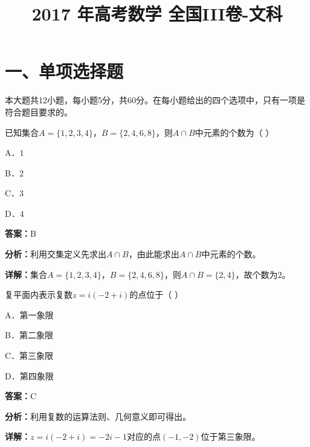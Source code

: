 ﻿\title{2017 年高考数学 全国III卷-文科}
\date{}
\maketitle

\section*{一、单项选择题}
本大题共12小题，每小题5分，共60分。在每小题给出的四个选项中，只有一项是符合题目要求的。

\begin{question}[points=5]
已知集合$A=\{1,2,3,4\}$，$B=\{2,4,6,8\}$，则$A\cap B$中元素的个数为（    ）
\begin{choices}
  \item A．$1$
  \item B．$2$
  \item C．$3$
  \item D．$4$
\end{choices}
\begin{solution}
\textbf{答案：}B

\textbf{分析：}利用交集定义先求出$A\cap B$，由此能求出$A\cap B$中元素的个数。

\textbf{详解：}集合$A=\{1,2,3,4\}$，$B=\{2,4,6,8\}$，则$A\cap B=\{2,4\}$，故个数为$2$。
\end{solution}
\end{question}

\begin{question}[points=5]
复平面内表示复数$z=i(-2+i)$的点位于（            ）
\begin{choices}
  \item A．第一象限
  \item B．第二象限
  \item C．第三象限
  \item D．第四象限
\end{choices}
\begin{solution}
\textbf{答案：}C

\textbf{分析：}利用复数的运算法则、几何意义即可得出。

\textbf{详解：}$z=i(-2+i)=-2i-1$对应的点$(-1,-2)$位于第三象限。
\end{solution}
\end{question}


